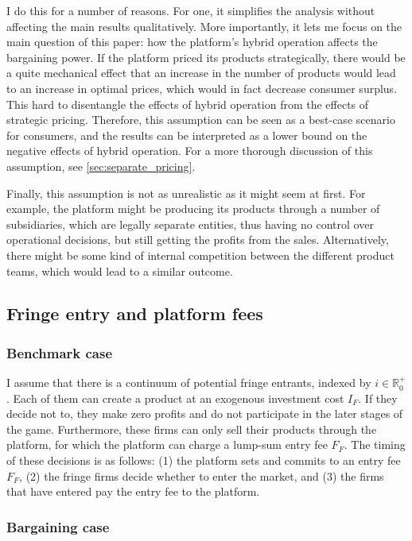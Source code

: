 \documentclass[a4paper]{article}
\begin{document}
I do this for a number of reasons.
For one, it simplifies the analysis without affecting the main results qualitatively.
More importantly, it lets me focus on the main question of this paper: how the platform's hybrid operation affects the bargaining power.
If the platform priced its products strategically, there would be a quite mechanical effect that an increase in the number of products would lead to an increase in optimal prices, which would in fact decrease consumer surplus.
This hard to disentangle the effects of hybrid operation from the effects of strategic pricing.
Therefore, this assumption can be seen as a best-case scenario for consumers, and the results can be interpreted as a lower bound on the negative effects of hybrid operation.
For a more thorough discussion of this assumption, see \cref{sec:separate_pricing}.

Finally, this assumption is not as unrealistic as it might seem at first.
For example, the platform might be producing its products through a number of subsidiaries, which are legally separate entities, thus having no control over operational decisions, but still getting the profits from the sales.
Alternatively, there might be some kind of internal competition between the different product teams, which would lead to a similar outcome.

\subsection{Fringe entry and platform fees}

\subsubsection{Benchmark case}

I assume that there is a continuum of potential fringe entrants, indexed by $i \in \mathbb{R}^+_0$.
Each of them can create a product at an exogenous investment cost $I_F$.
If they decide not to, they make zero profits and do not participate in the later stages of the game.
Furthermore, these firms can only sell their products through the platform, for which the platform can charge a lump-sum entry fee $F_F$.
The timing of these decisions is as follows: (1) the platform sets and commits to an entry fee $F_F$, (2) the fringe firms decide whether to enter the market, and (3) the firms that have entered pay the entry fee to the platform.

\subsubsection{Bargaining case}
\label{sec:model_bargaining}
\end{document}
